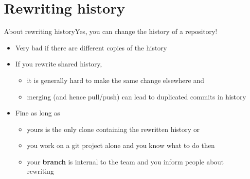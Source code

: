 \documentclass[usenames,svgnames,14pt]{beamer}
\begin{document}
\section{Rewriting history}
\begin{frame}{About rewriting history}{Yes, you can change the history of a repository!}
    \vspace{6mm}
    \begin{overlayarea}{\textwidth}{0.3\textheight}
        \setlength{\leftmargini}{5mm}
        \begin{itemize}
            \item\alert{Very bad if there are different copies of the history} 
            \item If you rewrite shared history,\\
                  \begin{itemize}
                      \item it is generally hard to make the same change elsewhere and\\
                      \item merging (and hence pull/push) can lead to duplicated commits in history
                  \end{itemize}
            \item<only@1> Fine as long as\\
                  \begin{itemize}
                      \item yours is the only clone containing the rewritten history or
                      \item you work on a git project alone and you know what to do then
                      \item your \textbf{branch} is internal to the team and you inform people about rewriting
                  \end{itemize}
        \end{itemize}
    \end{overlayarea}
    \vspace{-5mm}
    \begin{center}
\end{center}
\end{frame}
\end{document}
